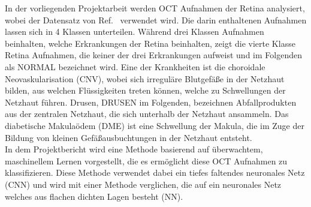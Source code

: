 In der vorliegenden Projektarbeit werden OCT Aufnahmen der Retina analysiert, wobei der Datensatz von Ref.~\cite{Dataset} verwendet wird. Die darin enthaltenen Aufnahmen lassen sich in 4 Klassen unterteilen. Während drei Klassen Aufnahmen beinhalten, welche Erkrankungen der Retina beinhalten, zeigt die vierte Klasse Retina Aufnahmen, die keiner der drei Erkrankungen aufweist und im Folgenden als NORMAL bezeichnet wird. Eine der Krankheiten ist die choroidale Neovaskularisation (CNV), wobei sich irreguläre Blutgefäße in der Netzhaut bilden, aus welchen Flüssigkeiten treten können, welche zu Schwellungen der Netzhaut führen. Drusen, DRUSEN im Folgenden, bezeichnen Abfallprodukten aus der zentralen Netzhaut, die sich unterhalb der Netzhaut ansammeln. Das diabetische Makulaödem (DME) ist eine Schwellung der Makula, die im Zuge der Bildung von kleinen Gefäßausbuchtungen in der Netzhaut entsteht.  \\
In dem Projektbericht wird eine Methode basierend auf überwachtem, maschinellem Lernen vorgestellt, die es ermöglicht diese OCT Aufnahmen zu klassifizieren. Diese Methode verwendet dabei ein tiefes faltendes neuronales Netz (CNN) und wird mit einer Methode verglichen, die auf ein neuronales Netz welches aus flachen dichten Lagen besteht (NN). 